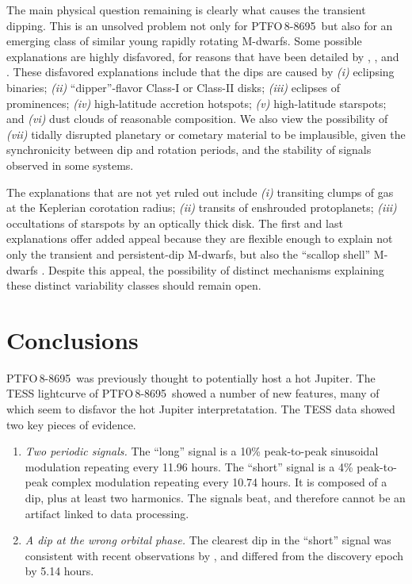 \documentclass[12pt,twocolumn,tighten]{aastex62}
\newcommand{\ptfo}{PTFO$\,$8-8695}
\begin{document}
The main physical question remaining is clearly what causes the
transient dipping. This is an unsolved problem not only for \ptfo\ but
also for an emerging class of similar young rapidly rotating M-dwarfs.
Some possible explanations are highly disfavored, for reasons that
have been detailed by \citet{david_transient_2017},
\citet{stauffer_orbiting_2017}, and \citet{zhan_complex_2019}.
These disfavored explanations include that the dips are caused by
{\it (i)} eclipsing binaries;
{\it (ii)} ``dipper''-flavor Class-I or Class-II disks;
{\it (iii)} eclipses of prominences;
{\it (iv)} high-latitude accretion hotspots;
{\it (v)} high-latitude starspots;
and
{\it (vi)} dust clouds of reasonable composition.
We also view the possibility of {\it (vii)} tidally disrupted planetary
or cometary material to be implausible, given the synchronicity
between dip and rotation periods, and the stability of signals
observed in some systems.

The explanations that are not yet ruled out include
{\it (i)} transiting clumps of gas at the Keplerian corotation radius;
{\it (ii)} transits of enshrouded protoplanets;
{\it (iii)} occultations of starspots by an optically thick disk.
The first and last explanations offer added appeal because they are
flexible enough to explain not only the transient and persistent-dip
M-dwarfs, but also the ``scallop shell'' M-dwarfs
\citep{stauffer_orbiting_2017}.
Despite this appeal, the possibility of distinct mechanisms 
explaining these
distinct variability classes should remain open.


\section{Conclusions}
\label{sec:conclusions}

\ptfo\ was previously thought to potentially host a hot Jupiter.
The TESS lightcurve of \ptfo\ showed a number of new features,
many of which seem to disfavor the hot Jupiter interpretatation.
The TESS data showed two key pieces of evidence.
\begin{enumerate}
  \item {\it Two periodic signals.} The ``long'' signal is a 10\%
      peak-to-peak sinusoidal modulation repeating every 11.96 hours.
      The ``short'' signal is a 4\% peak-to-peak complex modulation
      repeating every 10.74 hours. It is composed of a dip, plus at
      least two harmonics. The signals beat, and therefore cannot be
      an artifact linked to data processing.
  \item {\it A dip at the wrong orbital phase.} The clearest dip in
    the ``short'' signal was consistent with recent observations by
    \citet{tanimoto_evidence_2020}, and differed from the discovery
    epoch by 5.14 hours.
\end{enumerate}
\end{document}
